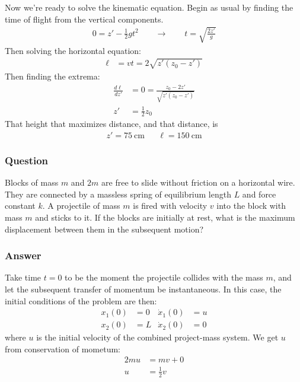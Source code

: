 Now we're ready to solve the kinematic equation. Begin as usual by finding the
time of flight from the vertical components.
\begin{align*}
    0 = z' - \frac 12 gt^2
	\quad\quad\rightarrow\quad\quad
    t = \sqrt{\frac{2z'}{g}}
\end{align*}
Then solving the horizontal equation:
\begin{align*}
    \ell  &= vt = 2\sqrt{z'(z_0 - z')}
\end{align*}
Then finding the extrema:
\begin{align*}
    \frac{d\ell }{dz'} &= 0 = \frac{z_0 - 2z'}{\sqrt{z'(z_0-z')}} \\
    z' &= \frac 12 z_0
\end{align*}
That height that maximizes distance, and that distance, is
\begin{align}
    \boxed{
    z' = \SI{75}{\cm}
    }
    &&
    \boxed{
    \ell  = \SI{150}{\cm}
    }
\end{align}

\subsubsection{Question}

Blocks of mass $m$ and $2m$ are free to slide without friction on a
horizontal wire. They are connected by a massless spring of equilibrium
length $L$ and force constant $k$. A projectile of mass $m$ is fired with
velocity $v$ into the block with mass $m$ and sticks to it. If the blocks
are initially at rest, what is the maximum displacement between them in the
subsequent motion?

\subsubsection{Answer}

Take time $t=0$ to be the moment the projectile collides with the mass $m$,
and let the subsequent transfer of momentum be instantaneous. In this case,
the initial conditions of the problem are then:
\begin{align*}
    x_1(0) &= 0			& \dot x_1(0) &= u \\
    x_2(0) &= L			& \dot x_2(0) &= 0
\end{align*}
where $u$ is the initial velocity of the combined project-mass system. We get
$u$ from conservation of mometum:
\begin{align*}
    2mu &= mv + 0 \\
    u &= \frac 12 v
\end{align*}

